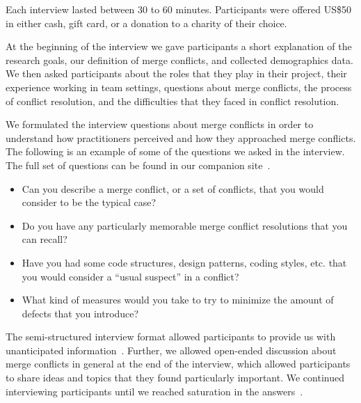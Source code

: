 
Each interview lasted between 30 to 60 minutes. Participants were offered US\$50 in either cash, gift card, or a donation to a charity of their choice.

At the beginning of the interview we gave participants a short explanation of the research goals, our definition of merge conflicts, and collected demographics data. 
We then asked participants about the roles that they play in their project, their experience working in team settings,  questions about merge conflicts, the process of conflict resolution, and the difficulties that they faced in conflict resolution.

We formulated the interview questions about merge conflicts in order to understand how practitioners perceived and how they approached merge conflicts.
The following is an example of some of the questions we asked in the interview. The full set of questions can be found in our companion site~\cite{companion_site}.
\begin{itemize}
	\item Can you describe a merge conflict, or a set of conflicts, that you would consider to be the typical case?
	\item Do you have any particularly memorable merge conflict resolutions that you can recall?
	\item Have you had some code structures, design patterns, coding styles, etc. that you would consider a ``usual suspect'' in a conflict?
	\item What kind of measures would you take to try to minimize the amount of defects that you introduce?
\end{itemize}

The semi-structured interview format allowed participants to provide us with unanticipated information~\cite{seaman2008qualitative}. 
Further, we allowed open-ended discussion about merge conflicts in general at the end of the interview, which allowed participants to share ideas and topics that they found particularly important. 
We continued interviewing participants until we reached saturation in the answers~\cite{fusch2015we}.

